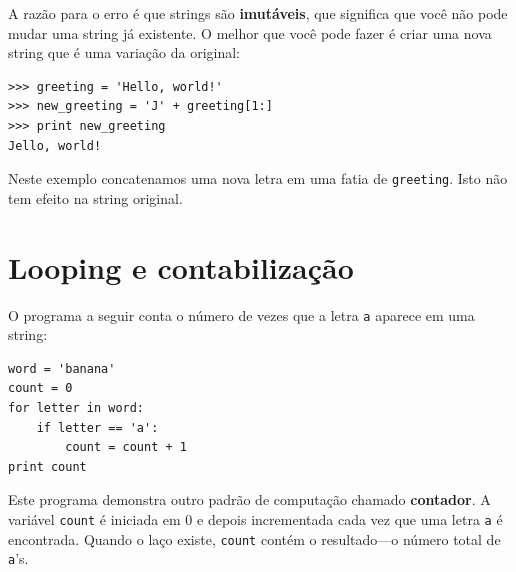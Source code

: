 {%


A razão para o erro é que strings são {\bf imutáveis}, que significa que você
não pode mudar uma string já existente. O melhor que você pode fazer é criar
uma nova string que é uma variação da original:

\beforeverb
\begin{verbatim}
>>> greeting = 'Hello, world!'
>>> new_greeting = 'J' + greeting[1:]
>>> print new_greeting
Jello, world!
\end{verbatim}
\afterverb
%
%
Neste exemplo concatenamos uma nova letra em uma fatia de {\tt greeting}.
Isto não tem efeito na string original.


\section{Looping e contabilização}
\label{contador}





O programa a seguir conta o número de vezes que a letra {\tt a} aparece em
uma string:

\beforeverb
\begin{verbatim}
word = 'banana'
count = 0
for letter in word:
    if letter == 'a':
        count = count + 1
print count
\end{verbatim}
\afterverb
%
%
Este programa demonstra outro padrão de computação chamado {\bf contador}. A
variável {\tt count} é iniciada em 0 e depois incrementada cada vez que uma
letra {\tt a} é encontrada. Quando o laço existe, {\tt count} contém o
resultado---o número total de {\tt a}'s.

}

